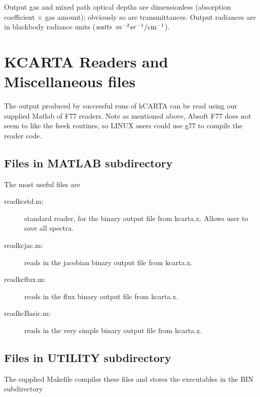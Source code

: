 \documentclass[11pt]{article}
\newcommand{\kc}{\textsf{kCARTA}\xspace}
\newcommand{\cm}{\hbox{cm}}
\begin{document}
Output gas and mixed path optical depths are dimensionless (absorption
coefficient $\times$ gas amount); obviously so are transmittances.
Output radiances are in blackbody radiance units ($\hbox{\em watts}
\;\ m^{-2} sr^{-1}/\cm^{-1}$).  

\section{KCARTA Readers and Miscellaneous files}

The output produced by successful runs of \kc can be read using our supplied
Matlab of F77 readers. Note as mentioned above, Absoft F77 does not seem to
like the fseek routines, so LINUX users could use g77 to compile the reader 
code.

\subsection{Files in MATLAB subdirectory}

The most useful files are

\begin{description}

\item[readkcstd.m:] standard reader, for the binary output file from
  kcarta.x. Allows user to save all spectra.

\item[readkcjac.m:] reads in the jacobian binary output file from
  kcarta.x.  

\item[readkcflux.m:] reads in the flux binary output file from
  kcarta.x.  

\item[readkcBasic.m:] reads in the very simple binary output file from
  kcarta.x.  

\end{description}

\subsection{Files in UTILITY subdirectory}

The supplied Makefile compiles these files and stores the
executables in the BIN subdirectory
\end{document}
